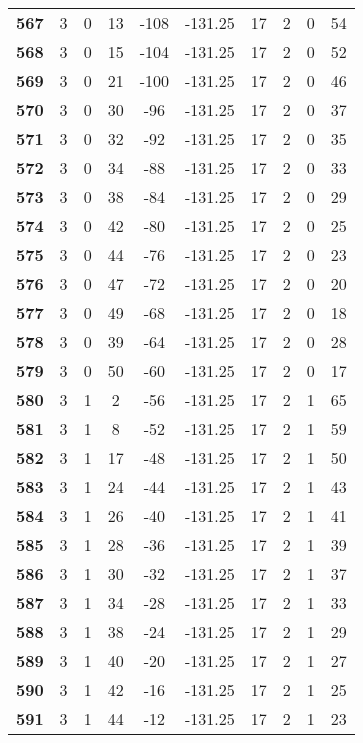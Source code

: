 \documentclass[12pt,letterpaper, onecolumn]{exam}
\begin{document}
\begin{longtable}{cccccccccc}
    \textbf{567} & 3 & 0 & 13 & -108 & -131.25 & 17 & 2 & 0 & 54 \\ 
    \textbf{568} & 3 & 0 & 15 & -104 & -131.25 & 17 & 2 & 0 & 52 \\ 
    \textbf{569} & 3 & 0 & 21 & -100 & -131.25 & 17 & 2 & 0 & 46 \\ 
    \textbf{570} & 3 & 0 & 30 & -96 & -131.25 & 17 & 2 & 0 & 37 \\ 
    \textbf{571} & 3 & 0 & 32 & -92 & -131.25 & 17 & 2 & 0 & 35 \\ 
    \textbf{572} & 3 & 0 & 34 & -88 & -131.25 & 17 & 2 & 0 & 33 \\ 
    \textbf{573} & 3 & 0 & 38 & -84 & -131.25 & 17 & 2 & 0 & 29 \\ 
    \textbf{574} & 3 & 0 & 42 & -80 & -131.25 & 17 & 2 & 0 & 25 \\ 
    \textbf{575} & 3 & 0 & 44 & -76 & -131.25 & 17 & 2 & 0 & 23 \\ 
    \textbf{576} & 3 & 0 & 47 & -72 & -131.25 & 17 & 2 & 0 & 20 \\ 
    \textbf{577} & 3 & 0 & 49 & -68 & -131.25 & 17 & 2 & 0 & 18 \\ 
    \textbf{578} & 3 & 0 & 39 & -64 & -131.25 & 17 & 2 & 0 & 28 \\ 
    \textbf{579} & 3 & 0 & 50 & -60 & -131.25 & 17 & 2 & 0 & 17 \\ 
    \textbf{580} & 3 & 1 & 2 & -56 & -131.25 & 17 & 2 & 1 & 65 \\ 
    \textbf{581} & 3 & 1 & 8 & -52 & -131.25 & 17 & 2 & 1 & 59 \\ 
    \textbf{582} & 3 & 1 & 17 & -48 & -131.25 & 17 & 2 & 1 & 50 \\ 
    \textbf{583} & 3 & 1 & 24 & -44 & -131.25 & 17 & 2 & 1 & 43 \\ 
    \textbf{584} & 3 & 1 & 26 & -40 & -131.25 & 17 & 2 & 1 & 41 \\ 
    \textbf{585} & 3 & 1 & 28 & -36 & -131.25 & 17 & 2 & 1 & 39 \\ 
    \textbf{586} & 3 & 1 & 30 & -32 & -131.25 & 17 & 2 & 1 & 37 \\ 
    \textbf{587} & 3 & 1 & 34 & -28 & -131.25 & 17 & 2 & 1 & 33 \\ 
    \textbf{588} & 3 & 1 & 38 & -24 & -131.25 & 17 & 2 & 1 & 29 \\ 
    \textbf{589} & 3 & 1 & 40 & -20 & -131.25 & 17 & 2 & 1 & 27 \\ 
    \textbf{590} & 3 & 1 & 42 & -16 & -131.25 & 17 & 2 & 1 & 25 \\ 
    \textbf{591} & 3 & 1 & 44 & -12 & -131.25 & 17 & 2 & 1 & 23 \\ 

\end{longtable}
\end{document}
